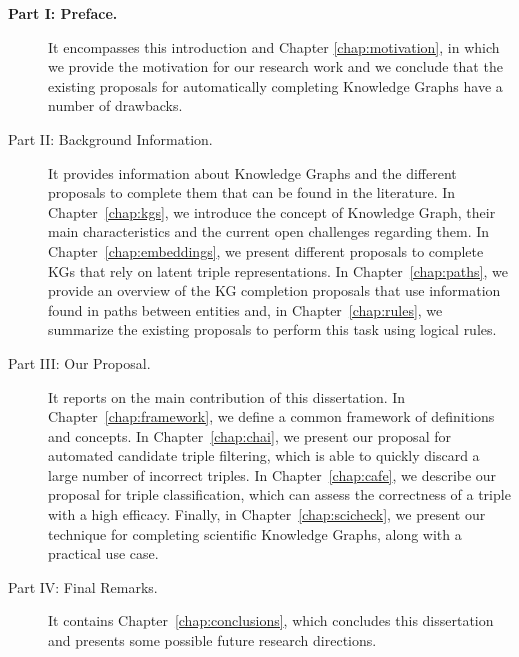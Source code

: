 \begin{description}
    \item[\textbf{Part I: Preface.}] It encompasses this introduction and Chapter \ref{chap:motivation}, in which we provide the motivation for our research work and we conclude that the existing proposals for automatically completing Knowledge Graphs have a number of drawbacks.\\
    
    \item[Part II: Background Information.] It provides information about Knowledge Graphs and the different proposals to complete them that can be found in the literature. In Chapter~\ref{chap:kgs}, we introduce the concept of Knowledge Graph, their main characteristics and the current open challenges regarding them. In Chapter~\ref{chap:embeddings}, we present different proposals to complete KGs that rely on latent triple representations. In Chapter~\ref{chap:paths}, we provide an overview of the KG completion proposals that use information found in paths between entities and, in Chapter~\ref{chap:rules}, we summarize the existing proposals to perform this task using logical rules.\\
    
    \item[Part III: Our Proposal.] It reports on the main contribution of this dissertation. In Chapter~\ref{chap:framework}, we define a common framework of definitions and concepts. In Chapter~\ref{chap:chai}, we present our proposal for automated candidate triple filtering, which is able to quickly discard a large number of incorrect triples. In Chapter~\ref{chap:cafe}, we describe our proposal for triple classification, which can assess the correctness of a triple with a high efficacy. Finally, in Chapter~\ref{chap:scicheck}, we present our technique for completing scientific Knowledge Graphs, along with a practical use case.\\
    
    \item[Part IV: Final Remarks.] It contains Chapter~\ref{chap:conclusions}, which concludes this dissertation and presents some possible future research directions.
\end{description}